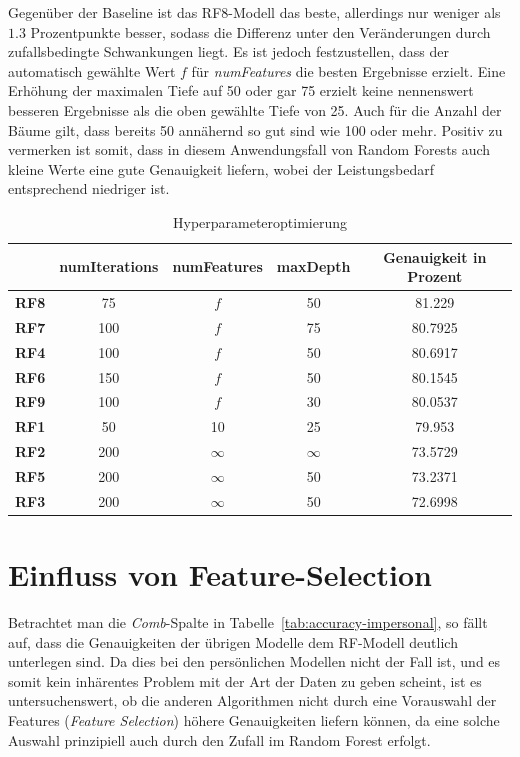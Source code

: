 Gegenüber der Baseline ist das RF8-Modell das beste, allerdings nur weniger als $1.3$ Prozentpunkte besser, sodass die Differenz unter den Veränderungen durch zufallsbedingte Schwankungen liegt. Es ist jedoch festzustellen, dass der automatisch gewählte Wert $f$ für \textit{numFeatures} die besten Ergebnisse erzielt. Eine Erhöhung der maximalen Tiefe auf 50 oder gar 75 erzielt keine nennenswert besseren Ergebnisse als die oben gewählte Tiefe von 25. Auch für die Anzahl der Bäume gilt, dass bereits 50 annähernd so gut sind wie 100 oder mehr. Positiv zu vermerken ist somit, dass in diesem Anwendungsfall von Random Forests auch kleine Werte eine gute Genauigkeit liefern, wobei der Leistungsbedarf entsprechend niedriger ist.

\begin{table}
\centering
\begin{tabular}{|c|c|c|c||c|}
	\hline 
	& \textbf{numIterations} & \textbf{numFeatures} & \textbf{maxDepth} & \textbf{Genauigkeit in Prozent} \\ 
	\hline 
	\textbf{RF8} & 75 & $f$ & 50 & 81.229 \\ 
	\hline 
	\textbf{RF7} & 100 & $f$ & 75 & 80.7925 \\ 
	\hline 
	\textbf{RF4} & 100 & $f$ & 50 & 80.6917 \\ 
	\hline 
	\textbf{RF6} & 150 & $f$ & 50 & 80.1545 \\ 
	\hline 
	\textbf{RF9} & 100 & $f$ & 30 & 80.0537 \\ 
	\hline 
	\textbf{RF1} & 50 & 10 & 25 & 79.953 \\ 
	\hline 
	\textbf{RF2} & 200 & $\infty$ & $\infty$ & 73.5729 \\ 
	\hline 
	\textbf{RF5} & 200 & $\infty$ & 50 & 73.2371 \\ 
	\hline 
	\textbf{RF3} & 200 & $\infty$ & 50 & 72.6998 \\ 
	\hline
\end{tabular}
\caption{Hyperparameteroptimierung}
\label{tab:hyperparam-opt}
\end{table}

\section{Einfluss von Feature-Selection}
Betrachtet man die \textit{Comb}-Spalte in Tabelle~\ref{tab:accuracy-impersonal}, so fällt auf, dass die Genauigkeiten der übrigen Modelle dem RF-Modell deutlich unterlegen sind. Da dies bei den persönlichen Modellen nicht der Fall ist, und es somit kein inhärentes Problem mit der Art der Daten zu geben scheint, ist es untersuchenswert, ob die anderen Algorithmen nicht durch eine Vorauswahl der Features (\textit{Feature Selection}) höhere Genauigkeiten liefern können, da eine solche Auswahl prinzipiell auch durch den Zufall im Random Forest erfolgt.

